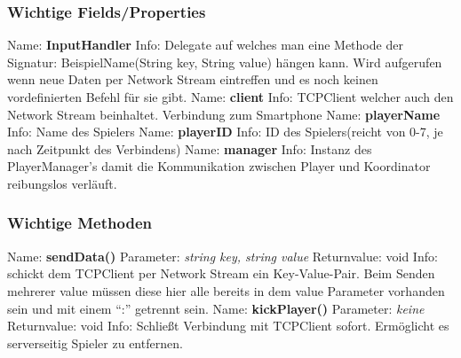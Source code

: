 \subsubsection{Wichtige Fields/Properties}
Name: \textbf{InputHandler}
\newline 
Info: Delegate auf welches man eine Methode der Signatur:
BeispielName(String key, String value) hängen kann. Wird aufgerufen wenn neue Daten per Network Stream eintreffen und es noch keinen vordefinierten Befehl für sie gibt.
\newline \newline
Name: \textbf{client}
\newline 
Info: TCPClient welcher auch den Network Stream beinhaltet. Verbindung zum Smartphone
\newline \newline
Name: \textbf{playerName}
\newline 
Info: Name des Spielers
\newline \newline
Name: \textbf{playerID}
\newline 
Info: ID des Spielers(reicht von 0-7, je nach Zeitpunkt des Verbindens)
\newline \newline
Name: \textbf{manager}
\newline
Info: Instanz des PlayerManager’s damit die Kommunikation zwischen Player und Koordinator reibungslos verläuft.
\newline \newline
\subsubsection{Wichtige Methoden}
Name: \textbf{sendData()}
\newline
Parameter: \textit{string key, string value}
\newline
Returnvalue: void
\newline
Info: schickt dem TCPClient per Network Stream ein Key-Value-Pair. Beim Senden mehrerer value müssen diese hier alle bereits in dem value Parameter vorhanden sein und mit einem “:” getrennt sein.
\newline \newline
Name: \textbf{kickPlayer()}
\newline
Parameter: \textit{keine}
\newline
Returnvalue: void
\newline
Info: Schließt Verbindung mit TCPClient sofort. Ermöglicht es serverseitig Spieler zu entfernen.
\newline
